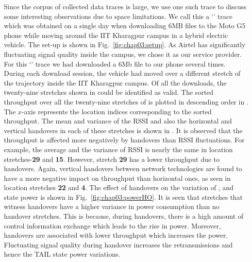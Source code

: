\indent  Since the corpus of collected data traces is large, we use one such trace to discuss some interesting observations due to space limitations. We call this a `' trace which was obtained on a single day when downloading 6MB files to the Moto G5 phone while moving around the IIT Kharagpur campus in a hybrid electric vehicle. The set-up is shown in Fig.~\ref{fig:chap03:setup}. As Airtel has significantly fluctuating signal quality inside the campus, we chose it as our service provider.  For this `' trace we had downloaded a 6Mb file to our phone several times. During each download session, the vehicle had moved over a different stretch of the trajectory inside the IIT Kharagpur campus.  Of all the downloads, the twenty-nine stretches  shown in \fig{\ref{fig:chap03:technology_with_traj}} could be identified as valid. The sorted throughput over all the twenty-nine stretches of  \fig{\ref{fig:chap03:technology_with_traj}} is plotted in descending order in \fig{\ref{fig:chap03:thptHO}}. The $x$-axis represents the location indices corresponding to the sorted throughput. The mean and variance of the \ac{RSSI} and also the horizontal and vertical handovers in each of these stretches is shown in \fig{\ref{fig:chap03:thptHO}}.  It is observed that the throughput is affected more negatively by handovers than \ac{RSSI} fluctuations. For example, the average and the variance of \ac{RSSI} is nearly the same  in location stretches-\textbf{29} and \textbf{15}. However, stretch \textbf{29} has a lower throughput due to handovers. Again, vertical handovers between network technologies  are found to have a more negative impact on throughput than horizontal ones, as seen in location stretches {\bf 22}  and {\bf 4}.  The effect of handovers on the variation of ,  and  state power is shown in Fig.~\ref{fig:chap03:powerHO}. It is seen that stretches that witness handovers have a higher variance in  power consumption than no handover stretches. This is because, during handovers, there is a high amount of control information exchange which leads to the rise in  power. Moreover, handovers are associated with lower throughput which increases the  power. Fluctuating signal quality during handover increases the retransmissions and hence the TAIL state power variations.


